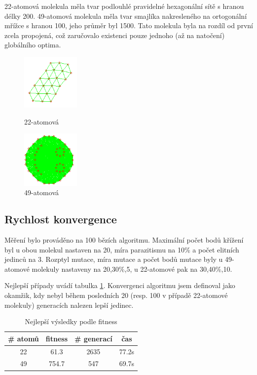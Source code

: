\documentclass[journal]{IEEEtrancz}
\begin{document}
22-atomová molekula měla tvar podlouhlé pravidelné hexagonální sítě s hranou délky 200. 49-atomová molekula měla tvar smajlíka nakresleného na ortogonální mřížce s hranou 100, jeho průměr byl 1500. Tato molekula byla na rozdíl od první zcela propojená, což zaručovalo existenci pouze jednoho (až na natočení) globálního optima.
\begin{figure}[h]
        \begin{minipage}[l]{0.22\textwidth}
            \includegraphics[width = 80pt]{globopt.png}
            \caption{22-atomová}
        \end{minipage}
        \begin{minipage}[r]{0.22\textwidth}
            \includegraphics[width = 80pt]{smajl.png}
            \caption{49-atomová}
        \end{minipage}
\end{figure}

\subsection{Rychlost konvergence}
Měření bylo prováděno na 100 bězích algoritmu. Maximální počet bodů křížení byl u obou molekul nastaven na 20, míra parazitismu na 10\% a počet elitních jedinců na 3. Rozptyl mutace, míra mutace a počet bodů mutace byly u 49-atomové molekuly nastaveny na 20,30\%,5, u 22-atomové pak na 30,40\%,10.

Nejlepší případy uvádí tabulka \ref{tab:besconv}. Konvergenci algoritmu jsem definoval jako okamžik, kdy nebyl během posledních 20 (resp. 100 v případě 22-atomové molekuly) generacích nalezen lepší jedinec.

\begin{table}[h]
  \centering
  \caption{Nejlepší výsledky podle fitness}
  \begin{tabular}{cccc}
  \toprule
   \# atomů & fitness & \# generací & čas \\
  \midrule
  22 & 61.3 & 2635 & 77.2s\\
  49 & 754.7 & 547 & 69.7s\\
  \bottomrule
  \end{tabular}
  \label{tab:besconv}
\end{table}
\end{document}
